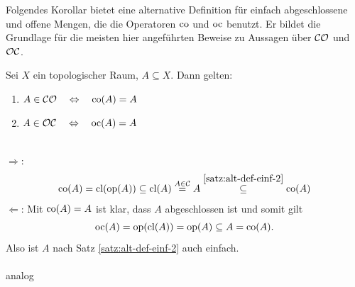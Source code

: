     Folgendes Korollar bietet eine alternative Definition für einfach abgeschlossene und offene Mengen, die die Operatoren $\text{co}$ und $\text{oc}$ benutzt. Er bildet die Grundlage für die meisten hier angeführten Beweise zu Aussagen über $\mathcal{CO}$ und $\mathcal{OC}$.
    \begin{kor}\label{kor:co(A)=A-oc(A)=A}
        Sei $X$ ein topologischer Raum, $A \subseteq X$. Dann gelten:
        \begin{enumerate}
            \item\label{satz:co(A)=A} $A \in \mathcal{CO} \quad \Leftrightarrow \quad \text{co}(A) = A$
            \item\label{satz:oc(A)=A} $A \in \mathcal{OC} \quad \Leftrightarrow \quad \text{oc}(A) = A$
        \end{enumerate}
    \end{kor}
    \begin{bew}
        \\ 
        \glqq $\boldsymbol{\Rightarrow}$\grqq:
        \begin{align*}
            \text{co}(A) = \text{cl}(\text{op}(A)) 
            \subseteq \text{cl}(A) 
            \overset{A \in \mathcal{C}}{=} A 
            \overset{\ref{satz:alt-def-einf-2}}{\subseteq} \text{co}(A)
        \end{align*}
        \glqq $\boldsymbol{\Leftarrow}$\grqq: Mit $\text{co}(A) = A$ ist klar, dass $A$ abgeschlossen ist und somit gilt $$\text{oc}(A) = \text{op}(\text{cl}(A)) = \text{op}(A) \subseteq A = \text{co}(A).$$ Also ist $A$ nach Satz \ref{satz:alt-def-einf-2} auch einfach.\\ \ \\
         analog
    \end{bew}
        
